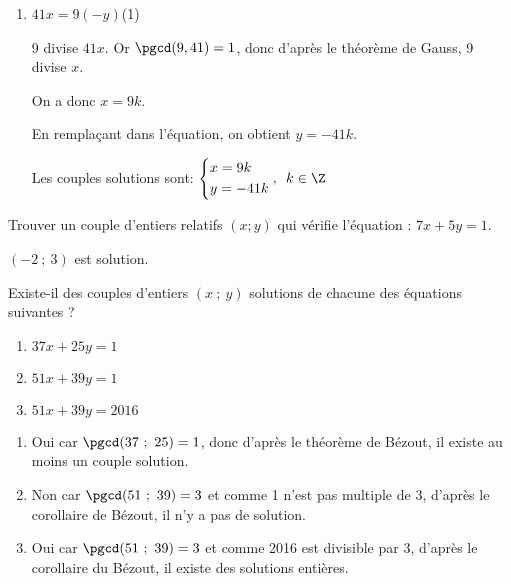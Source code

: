 \documentclass{cornouaille}
\begin{document}
\begin{colonne*exercice}
\begin{corrige}
\begin{enumerate}
On  a donc $x+3=4k$. 

En remplaçant dans l'équation, on obtient $y=5k$.

Les couples solutions sont :
$\left\{\begin{aligned}
&x\hskip-.5mm=-\hskip-.5mm3+4k\\
&y\hskip-.5mm=\hskip-.5mm5k\end{aligned}\right.\hskip-.5mm, k\in\Z$

\item $41x=9(-y)$\enskip (1)

  9 divise $41x$. Or $\pgcd(9,41)=1$, donc d'après le théorème de
  Gauss, 9 divise $x$.

On  a donc $x=9k$. 

En remplaçant dans l'équation, on obtient $y=-41k$.

Les couples solutions sont: 
$\left\{\begin{aligned}
&x=9k\\
&y=-41k\end{aligned}\right.,\enskip k\in\Z$
\end{enumerate}
\end{corrige}

\begin{exercice*}
  Trouver un couple d’entiers relatifs $(x ; y)$ qui vérifie
  l’équation : $7x+5y=1$.
\end{exercice*}
\begin{corrige}
  $(-2\ ;\ 3)$ est solution.
\end{corrige}

\begin{exercice*}
  Existe-il des couples d’entiers $(x\ ;\ y)$ solutions de chacune des
  équations suivantes ?
\begin{enumerate}
\item $37x + 25y = 1$
\item $51x + 39y = 1$
\item $51x + 39y = 2016$
\end{enumerate}
\end{exercice*}
\begin{corrige}
  \begin{enumerate}
  \item Oui car $\pgcd(37\ ;\ 25)=1$, donc d'après le théorème de
    Bézout, il existe au moins un couple solution.
  \item Non car $\pgcd(51\ ;\ 39)=3$ et comme 1 n'est pas multiple de
    3, d'après le corollaire de Bézout, il n'y a pas de solution.
  \item Oui car $\pgcd(51\ ;\ 39)=3$ et comme 2016 est divisible par
    3, d'après le corollaire du Bézout, il existe des solutions
    entières.
\end{enumerate}
\end{corrige}


\end{colonne*exercice}
\end{document}
